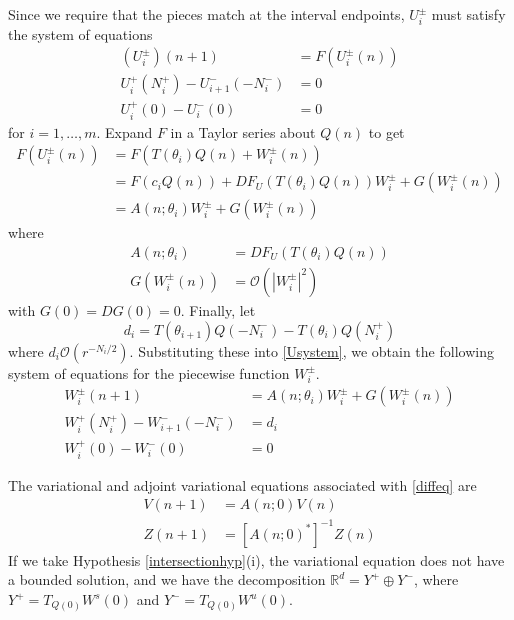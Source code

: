 \documentclass[12pt]{article}
\def\R{{\mathbb R}}
\begin{document}
Since we require that the pieces match at the interval endpoints, $U_i^\pm$ must satisfy the system of equations
\begin{equation}\label{Usystem}
\begin{aligned}
(U_i^\pm)(n+1) &= F(U_i^\pm(n))  \\
U_i^+(N_i^+) - U_{i+1}^-(-N_i^-) &= 0 \\
U_i^+(0) - U_i^-(0) &= 0
\end{aligned}
\end{equation}
for $i = 1, \dots, m$. Expand $F$ in a Taylor series about $Q(n)$ to get
\begin{align*}
F(U_i^\pm(n)) &= F(T(\theta_i) Q(n) + W_i^\pm(n)) \\
&= F(c_i Q(n)) + DF_{U}(T(\theta_i) Q(n)) W_i^\pm + G(W_i^\pm(n)) \\
&= A(n; \theta_i) W_i^\pm + G(W_i^\pm(n))
\end{align*}
where
\begin{align*}
A(n; \theta_i) &= DF_{U}(T(\theta_i) Q(n))\\
G(W_i^\pm(n)) &= \mathcal{O}(|W_i^\pm|^2)
\end{align*}
with $G(0) = DG(0) = 0$. Finally, let 
\begin{equation}\label{defdi}
d_i = T(\theta_{i+1}) Q(-N_i^-) - T(\theta_i) Q(N_i^+)
\end{equation}
where $d_i \mathcal{O}(r^{-N_i/2})$. Substituting these into \eqref{Usystem}, we obtain the following system of equations for the piecewise function $W_i^\pm$.
\begin{align}
W_i^\pm(n+1) &= A(n; \theta_i) W_i^\pm + G(W_i^\pm(n)) \label{Wsystem1} \\
W_i^+(N_i^+) - W_{i+1}^-(-N_i^-) &= d_i \label{Wsystem2} \\
W_i^+(0) - W_i^-(0) &= 0 \label{Wsystem3}
\end{align}

The variational and adjoint variational equations associated with \eqref{diffeq} are
\begin{align}
V(n+1) &= A(n; 0) V(n) \label{vareq} \\
Z(n+1) &= [A(n; 0)^*]^{-1} Z(n) \label{adjvareq} 
\end{align}
If we take Hypothesis \ref{intersectionhyp}(i), the variational equation does not have a bounded solution, and we have the decomposition $\R^d = Y^+ \oplus Y^-$, where $Y^+ = T_{Q(0)} W^s(0)$ and $Y^- = T_{Q(0)} W^u(0)$.
\end{document}
